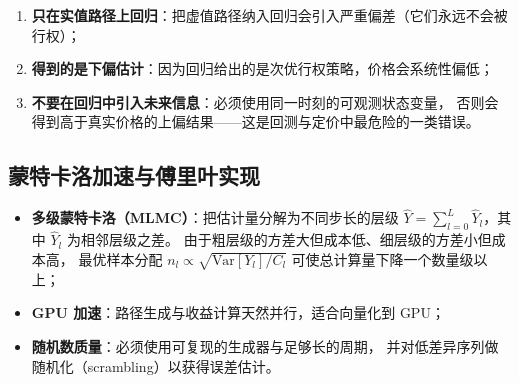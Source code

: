 \begin{warningbox}
\begin{enumerate}[leftmargin=1.6em]
  \item \textbf{只在实值路径上回归}：把虚值路径纳入回归会引入严重偏差（它们永远不会被行权）；
  \item \textbf{得到的是下偏估计}：因为回归给出的是次优行权策略，价格会系统性偏低；
  \item \textbf{不要在回归中引入未来信息}：必须使用同一时刻的可观测状态变量，
        否则会得到高于真实价格的上偏结果——这是回测与定价中最危险的一类错误。
\end{enumerate}
\end{warningbox}

\subsection{蒙特卡洛加速与傅里叶实现}

\begin{itemize}[leftmargin=1.8em]
  \item \textbf{多级蒙特卡洛（MLMC）}：把估计量分解为不同步长的层级
        $\hat{Y}=\sum_{l=0}^{L}\hat{Y}_l$，其中 $\hat{Y}_l$ 为相邻层级之差。
        由于粗层级的方差大但成本低、细层级的方差小但成本高，
        最优样本分配 $n_l\propto\sqrt{\text{Var}[Y_l]/C_l}$ 可使总计算量下降一个数量级以上；
  \item \textbf{GPU 加速}：路径生成与收益计算天然并行，适合向量化到 GPU；
  \item \textbf{随机数质量}：必须使用可复现的生成器与足够长的周期，
        并对低差异序列做随机化（scrambling）以获得误差估计。
\end{itemize}

